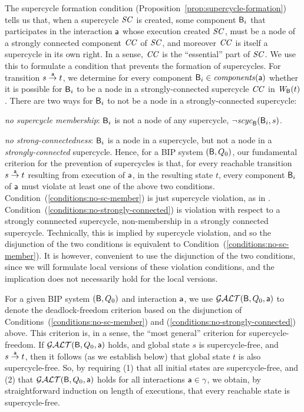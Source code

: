 
The supercycle formation condition (Proposition~\ref{prop:supercycle-formation}) tells us that, when a supercycle $\SC$ is created, some component
$\B_i$ that participates in the interaction $\act$ whose execution created $\SC$, must be a node of a strongly connected component $\CC$ of $\SC$, and
moreover $\CC$ is itself a supercycle in its own right. In a sense, $\CC$ is the ``essential'' part of $\SC$.  We use this to formulate a condition
that prevents the formation of supercycles. For transition $s \goesto[\act] t$, we determine for every component $\B_i \in \cmps{\act}$ whether it is
possible for $\B_i$ to be a node in a strongly-connected supercycle $\CC$ in $\wfg{\B}{t}$.  There are two ways for $\B_i$ to not be a node in a
strongly-connected supercycle: 
%
\bn
\item \label{conditions:no-sc-member}   \textit{no supercycle membership}: $\B_i$ is not a node of any supercycle, \ie $\neg \scyc{\B}{s}{\B_i}$.
\item  \label{conditions:no-strongly-connected} \textit{no strong-connectedness}: $\B_i$ is a node in a supercycle, but not a node in a \emph{strongly-connected} supercycle. 
\en
%
Hence, for a BIP system $(\B, Q_0)$, our fundamental criterion for the prevention of supercycles is that, for every reachable transition
$s \goesto[\act] t$ resulting from execution of $\act$, in the resulting state $t$, every component $\B_i$ of $\act$ must violate at least one of the
above two conditions.  Condition~(\ref{conditions:no-sc-member}) is just supercycle violation, as in .
Condition~(\ref{conditions:no-strongly-connected}) is violation with respect to a strongly connnected supercycle, \ie non-membership in a strongly
connected supercycle. Technically, this is implied by supercycle violation, and so the disjunction of the two conditions is equivalent to 
Condition~(\ref{conditions:no-sc-member}). It is however, convenient to use the disjunction of the two conditions, since
we will formulate local versions of these violation conditions, and the implication does not necessarily hold for the local versions.

For a given BIP system $(\B, Q_0)$ and interaction $\act$, we use $\GAO(\B, Q_0, \act)$ to denote the deadlock-freedom criterion based on the
disjunction of Conditions~(\ref{conditions:no-sc-member}) and (\ref{conditions:no-strongly-connected}) above. 
This criterion is, in a sense, the ``most general'' criterion for supercycle-freedom.
%
If $\GAO(\B, Q_0, \act)$ holds, and global state $s$ is supercycle-free, and $s \goesto[\act] t$, then it follows (as we establish below) that global
state $t$ is also supercycle-free.  So, by requiring (1) that all initial states are supercycle-free, and (2) that $\GAO(\B, Q_0, \act)$ holds for all
interactions $\act \in \gamma$, we obtain, by straightforward induction on length of executions, that every reachable state is supercycle-free.

